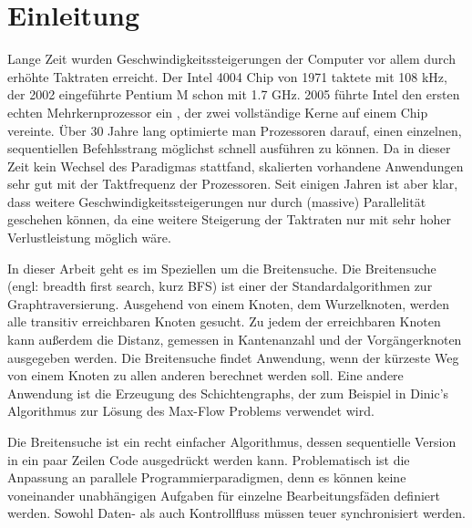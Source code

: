 \chapter{Einleitung}
\label{ch:einleitung}

Lange Zeit wurden Geschwindigkeitssteigerungen der Computer vor allem durch erhöhte Taktraten erreicht. Der Intel 4004 Chip von 1971 taktete mit 108 kHz, der 2002 eingeführte Pentium M schon mit 1.7 GHz. 2005 führte Intel den ersten echten Mehrkernprozessor ein \cite{Intel:2006:Online}, der zwei vollständige Kerne auf einem Chip vereinte. Über 30 Jahre lang optimierte man Prozessoren darauf, einen einzelnen, sequentiellen Befehlsstrang möglichst schnell ausführen zu können. Da in dieser Zeit kein Wechsel des Paradigmas stattfand, skalierten vorhandene Anwendungen sehr gut mit der Taktfrequenz der Prozessoren. Seit einigen Jahren ist aber klar, dass weitere Geschwindigkeitssteigerungen nur durch (massive) Parallelität geschehen können, da eine weitere Steigerung der Taktraten nur mit sehr hoher Verlustleistung möglich wäre.

In dieser Arbeit geht es im Speziellen um die Breitensuche. Die Breitensuche (engl: breadth first search, kurz BFS) ist einer der Standardalgorithmen zur Graphtraversierung. Ausgehend von einem Knoten, dem Wurzelknoten, werden alle transitiv erreichbaren Knoten gesucht. Zu jedem der erreichbaren Knoten kann außerdem die Distanz, gemessen in Kantenanzahl und der Vorgängerknoten ausgegeben werden. Die Breitensuche findet Anwendung, wenn der kürzeste Weg von einem Knoten zu allen anderen berechnet werden soll. Eine andere Anwendung ist die Erzeugung des Schichtengraphs, der zum Beispiel in Dinic's Algorithmus zur Lösung des Max-Flow Problems \cite{Dinitz:2006} verwendet wird. 

Die Breitensuche ist ein recht einfacher Algorithmus, dessen sequentielle Version in ein paar Zeilen Code ausgedrückt werden kann. Problematisch ist die Anpassung an parallele Programmierparadigmen, denn es können keine voneinander unabhängigen Aufgaben für einzelne Bearbeitungsfäden definiert werden. Sowohl Daten- als auch Kontrollfluss müssen teuer synchronisiert werden.


